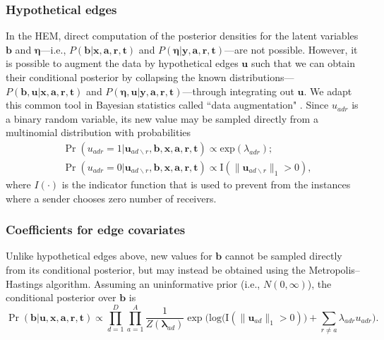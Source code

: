 \documentclass[ba]{imsart}
\numberwithin{equation}{section}
\theoremstyle{plain}
\begin{document}
\subsubsection{Hypothetical edges}
In the HEM, direct computation of the posterior densities for the latent variables $\boldsymbol{b}$ and $\boldsymbol{\eta}$---i.e., $P(\boldsymbol{b}|\boldsymbol{x},\boldsymbol{a}, \boldsymbol{r},\boldsymbol{t})$ and $P(\boldsymbol{\eta}|\boldsymbol{y},\boldsymbol{a}, \boldsymbol{r},\boldsymbol{t})$---are not possible. However, it is possible to augment the data by hypothetical edges $\boldsymbol{u}$ such that we can obtain their conditional posterior by collapsing the known distributions---$P(\boldsymbol{b}, \boldsymbol{u}|\boldsymbol{x},\boldsymbol{a}, \boldsymbol{r},\boldsymbol{t})$ and $P(\boldsymbol{\eta}, \boldsymbol{u}| \boldsymbol{y},\boldsymbol{a}, \boldsymbol{r},\boldsymbol{t})$---through integrating out $\boldsymbol{u}$. We adapt this common tool in Bayesian statistics called ``data augmentation" \citep{tanner1987calculation,neal2015exact}. Since $u_{adr}$ is a binary random variable, its new value may be sampled directly from a multinomial distribution with probabilities
\begin{equation}
\begin{aligned}
&\Pr(u_{adr}=1| \boldsymbol{u}_{ad\backslash r}, \boldsymbol{b}, \boldsymbol{x},\boldsymbol{a}, \boldsymbol{r},\boldsymbol{t})
\propto \mbox{exp}(\lambda_{adr});\\
&\Pr(u_{adr}=0| \boldsymbol{u}_{ad\backslash r},\boldsymbol{b}, \boldsymbol{x},\boldsymbol{a}, \boldsymbol{r},\boldsymbol{t})\propto \text{I}(\lVert\boldsymbol{u}_{ad\backslash r}\rVert_1 > 0 ),
\end{aligned}
\label{eqn:latentreceiver}
\end{equation}
where $I(\cdot)$ is the indicator function that is used to prevent from the instances where a sender chooses zero number of receivers. 
\subsubsection{Coefficients for edge covariates}
Unlike hypothetical edges above, new values for $\boldsymbol{b}$ cannot be sampled directly from its conditional posterior, but may instead be obtained using the Metropolis--Hastings algorithm. Assuming an uninformative prior (i.e., $N({0},\infty)$), the conditional posterior over $\boldsymbol{b}$ is
\begin{equation}
\Pr(\boldsymbol{b}| \boldsymbol{u}, \boldsymbol{x}, \boldsymbol{a}, \boldsymbol{r},\boldsymbol{t})\propto \prod_{d=1}^D
\prod_{a=1}^A \frac{1}{Z(\boldsymbol{\lambda}_{ad})}\exp\Big(\mbox{log}\big(\text{I}( \lVert \boldsymbol{u}_{ad}\rVert_1 > 0)\big) + \sum\limits_{r \neq a} \lambda_{adr}u_{adr}\Big).
\label{eqn:latentedge}
\end{equation}
\end{document}
